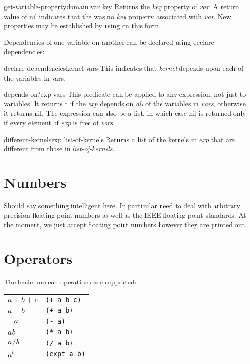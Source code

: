 \begin{functiondef}{get-variable-property}{domain var key}
Returns the {\em key} property of {\em var}.  A return value of {\sf
nil} indicates that the was no {\em key} property associated with {\em
var\/}.  New properties may be established by using  on this
form.  
\end{functiondef}

Dependencies of one variable on another can be declared using {\sf
declare-dependencies}:

\begin{functiondef}{declare-dependencies}{kernel \rest vars}
This indicates that {\em kernel} depends upon each of the variables in
{\sf vars\/}.
\end{functiondef}

\begin{functiondef}{depends-on?}{exp \rest vars}
This predicate can be applied to any expression, not just to
variables.  It returns {\sf t} if the {\em exp} depends on {\em all}
of the variables in {\em vars}, otherwise it returns {\sf nil}.  The
expression can also be a list, in which case {\sf nil} is returned
only if every element of {\em exp} is free of {\em vars}. 
\end{functiondef}

\begin{functiondef}{different-kernels}{exp list-of-kernels}
Returns a list of the kernels in {\em exp} that are different from
those in {\em list-of-kernels\/}.
\end{functiondef}

\section{Numbers}

Should say something intelligent here.  In particular need to deal with
arbitrary precision floating point numbers as well as the IEEE floating
point standards.  At the moment, we just accept floating point numbers
however they are printed out.

\section{Operators}
The basic boolean operations are supported:
\begin{center}
\begin{tabular}{ll}
$a+b+c$ & {\tt (+ a b c)} \\
$a - b$ & {\tt (+ a b)} \\
$-a$ & {\tt (- a)} \\
$ab$ & {\tt (* a b)} \\
$a/b$ & {\tt (/ a b)} \\
$a^b$ & {\tt (expt a b)}
\end{tabular}
\end{center}

